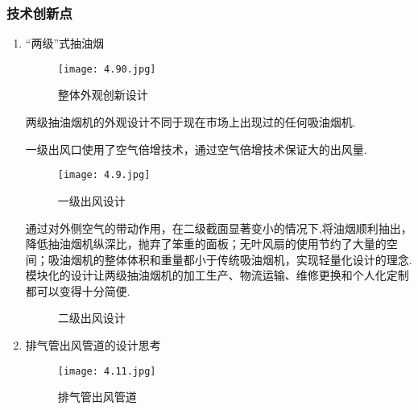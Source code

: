 \subsubsection{技术创新点}
\begin{enumerate}
\item “两级”式抽油烟

      \begin{figure}[H]
      \centering
      \texttt{[image: 4.90.jpg]}
      \caption{整体外观创新设计}
      \label{整体外观创新设计}
      \end{figure}
	  两级抽油烟机的外观设计不同于现在市场上出现过的任何吸油烟机.

      一级出风口使用了空气倍增技术，通过空气倍增技术保证大的出风量.
      \begin{figure}[H]
      \centering
      \texttt{[image: 4.9.jpg]}
      \caption{一级出风设计}
      \label{一级出风设计}
      \end{figure}

      通过对外侧空气的带动作用，在二级截面显著变小的情况下,将油烟顺利抽出，降低抽油烟机纵深比，抛弃了笨重的面板；无叶风扇的使用节约了大量的空间；吸油烟机的整体体积和重量都小于传统吸油烟机，实现轻量化设计的理念.模块化的设计让两级抽油烟机的加工生产、物流运输、维修更换和个人化定制都可以变得十分简便.

      \begin{figure}[H]
      \centering
      \caption{二级出风设计}
      \label{二级出风设计}
      \end{figure}

\item 排气管出风管道的设计思考

      \begin{figure}[H]
      \centering
      \texttt{[image: 4.11.jpg]}
      \caption{排气管出风管道}
      \label{排气管出风管道}
      \end{figure}


\end{enumerate}
